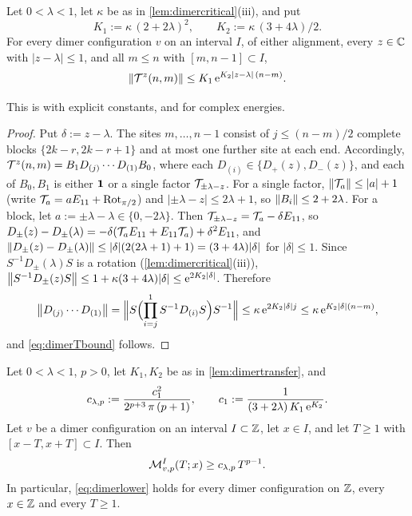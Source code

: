 \begin{lemma}[Uniform transfer-matrix bound near $E_c=\lambda$]\label{lem:dimertransfer}
Let $0<\lambda<1$, let $\kappa$ be as in \cref{lem:dimercritical}(iii), and put
\[
  K_1:=\kappa\,(2+2\lambda)^2,\qquad K_2:=\kappa\,(3+4\lambda)/2 .
\]
For every dimer configuration $v$ on an interval $I$, of either alignment, every $z\in\mathbb{C}$ with
$|z-\lambda|\le1$, and all $m\le n$ with $[m,n-1]\subset I$,
\begin{equation}\label{eq:dimerTbound}
  \left\|\mathcal{T}^z(n,m)\right\|\le K_1\,\mathrm{e}^{K_2|z-\lambda|\,(n-m)} .
\end{equation}
\end{lemma}

This is \cite[Prop.~1]{JSBS2003} with explicit constants, and for complex energies.

\begin{proof}
Put $\delta:=z-\lambda$.  The sites $m,\dots,n-1$ consist of $j\le(n-m)/2$ complete blocks
$\{2k-r,2k-r+1\}$ and at most one further site at each end.  Accordingly,
$\mathcal{T}^z(n,m)=B_1D_{(j)}\cdots D_{(1)}B_0$, where each $D_{(i)}\in\{D_+(z),D_-(z)\}$, and each of
$B_0,B_1$ is either $\mathbf{1}$ or a single factor $\mathcal{T}_{\pm\lambda-z}$.  For a single factor,
$\left\|\mathcal{T}_a\right\|\le|a|+1$ (write $\mathcal{T}_a=aE_{11}+\mathrm{Rot}_{\pi/2}$) and $|\pm\lambda-z|\le2\lambda+1$, so
$\left\|B_i\right\|\le2+2\lambda$.  For a block, let $a:=\pm\lambda-\lambda\in\{0,-2\lambda\}$.  Then
$\mathcal{T}_{\pm\lambda-z}=\mathcal{T}_a-\delta E_{11}$, so
$D_\pm(z)-D_\pm(\lambda)=-\delta(\mathcal{T}_aE_{11}+E_{11}\mathcal{T}_a)+\delta^2E_{11}$, and
$\left\|D_\pm(z)-D_\pm(\lambda)\right\|\le|\delta|(2(2\lambda+1)+1)=(3+4\lambda)|\delta|$ for $|\delta|\le1$.
Since $S^{-1}D_\pm(\lambda)S$ is a rotation (\cref{lem:dimercritical}(iii)),
$\left\|S^{-1}D_\pm(z)S\right\|\le1+\kappa(3+4\lambda)|\delta|\le\mathrm{e}^{2K_2|\delta|}$.  Therefore
\[
  \left\|D_{(j)}\cdots D_{(1)}\right\|=\Bigl\|S\Bigl(\prod_{i=j}^{1}S^{-1}D_{(i)}S\Bigr)S^{-1}\Bigr\|
  \le\kappa\,\mathrm{e}^{2K_2|\delta|j}\le\kappa\,\mathrm{e}^{K_2|\delta|(n-m)},
\]
and \eqref{eq:dimerTbound} follows.
\end{proof}

\begin{proposition}\label{prop:dimerlower}
Let $0<\lambda<1$, $p>0$, let $K_1,K_2$ be as in \cref{lem:dimertransfer}, and
\begin{equation}\label{eq:clp}
  c_{\lambda,p}:=\frac{c_1^2}{2^{p+3}\,\pi\,(p+1)},\qquad c_1:=\frac{1}{(3+2\lambda)\,K_1\,\mathrm{e}^{K_2}} .
\end{equation}
Let $v$ be a dimer configuration on an interval $I\subset\mathbb{Z}$, let $x\in I$, and let $T\ge1$ with
$[x-T,x+T]\subset I$.  Then
\begin{equation}\label{eq:dimerlower}
  \mathcal{M}^I_{v,p}(T;x)\ge c_{\lambda,p}\,T^{p-1}.
\end{equation}
In particular, \eqref{eq:dimerlower} holds for every dimer configuration on $\mathbb{Z}$, every $x\in\mathbb{Z}$ and
every $T\ge1$.
\end{proposition}

